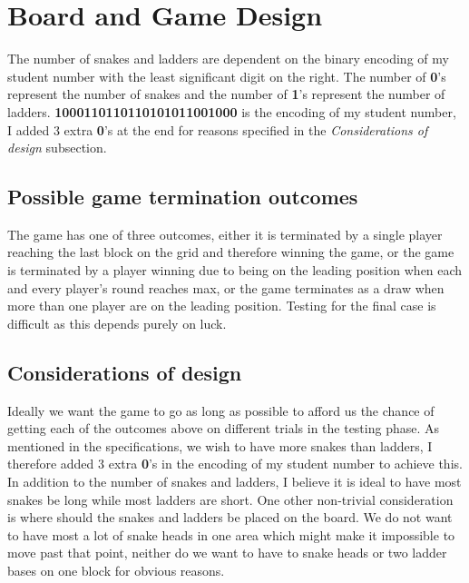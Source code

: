 \section*{Board and Game Design}
The number of snakes and ladders are dependent on the binary encoding of my student number with the least significant digit on the right. The number of \textbf{0}'s represent the number of snakes and the number of \textbf{1}'s represent the number of ladders. \textbf{1000110110110101011001000} is the encoding of my student number, I added 3 extra \textbf{0}'s at the end for reasons specified in the \textit{Considerations of design} subsection.

\subsection*{Possible game termination outcomes}
The game has one of three outcomes, either it is terminated by a single player reaching the last block on the grid and therefore winning the game, or the game is terminated by a player winning due to being on the leading position when each and every player's round reaches max, or the game terminates as a draw when more than one player are on the leading position. Testing for the final case is difficult as this depends purely on luck.

\subsection*{Considerations of design}
Ideally we want the game to go as long as possible to afford us the chance of getting each of the outcomes above on different trials in the testing phase. As mentioned in the specifications, we wish to have more snakes than ladders, I therefore added 3 extra \textbf{0}'s in the encoding of my student number to achieve this. In addition to the number of snakes and ladders, I believe it is ideal to have most snakes be long while most ladders are short. One other non-trivial consideration is where should the snakes and ladders be placed on the board. We do not want to have most a lot of snake heads in one area which might make it impossible to move past that point, neither do we want to have to snake heads or two ladder bases on one block for obvious reasons.  

